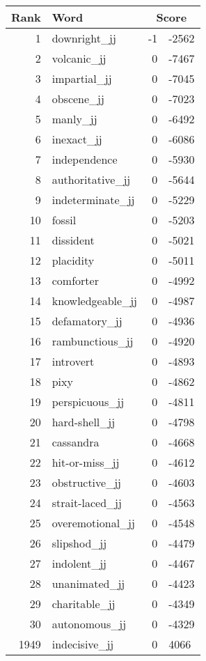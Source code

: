\begin{longtable}[!htbp]{| rlr@{.}l |}
    \hline
    \textbf{Rank} & \textbf{Word} & \multicolumn{2}{c|}{\textbf{Score}} \\
    \hline
    \endhead
    1 & downright\_jj & -1 & -2562 \\
    2 & volcanic\_jj & 0 & -7467 \\
    3 & impartial\_jj & 0 & -7045 \\
    4 & obscene\_jj & 0 & -7023 \\
    5 & manly\_jj & 0 & -6492 \\
    6 & inexact\_jj & 0 & -6086 \\
    7 & independence & 0 & -5930 \\
    8 & authoritative\_jj & 0 & -5644 \\
    9 & indeterminate\_jj & 0 & -5229 \\
    10 & fossil & 0 & -5203 \\
    11 & dissident & 0 & -5021 \\
    12 & placidity & 0 & -5011 \\
    13 & comforter & 0 & -4992 \\
    14 & knowledgeable\_jj & 0 & -4987 \\
    15 & defamatory\_jj & 0 & -4936 \\
    16 & rambunctious\_jj & 0 & -4920 \\
    17 & introvert & 0 & -4893 \\
    18 & pixy & 0 & -4862 \\
    19 & perspicuous\_jj & 0 & -4811 \\
    20 & hard-shell\_jj & 0 & -4798 \\
    21 & cassandra & 0 & -4668 \\
    22 & hit-or-miss\_jj & 0 & -4612 \\
    23 & obstructive\_jj & 0 & -4603 \\
    24 & strait-laced\_jj & 0 & -4563 \\
    25 & overemotional\_jj & 0 & -4548 \\
    26 & slipshod\_jj & 0 & -4479 \\
    27 & indolent\_jj & 0 & -4467 \\
    28 & unanimated\_jj & 0 & -4423 \\
    29 & charitable\_jj & 0 & -4349 \\
    30 & autonomous\_jj & 0 & -4329 \\
    1949 & indecisive\_jj & 0 & 4066 \\

\end{longtable}

